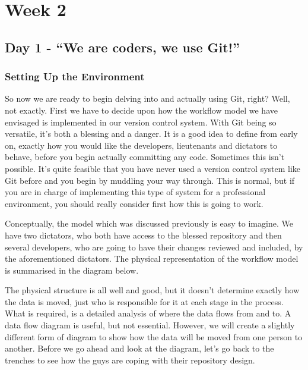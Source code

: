 \chapter{Week 2}
\section{Day 1 - ``We are coders, we use Git!''}
\subsection{Setting Up the Environment}
So now we are ready to begin delving into and actually using Git, right? Well, not exactly.
First we have to decide upon how the workflow model we have envisaged is implemented in our version control system.
With Git being so versatile, it's both a blessing and a danger.
It is a good idea to define from early on, exactly how you would like the developers, lieutenants and dictators to behave, before you begin actually committing any code.
Sometimes this isn't possible.
It's quite feasible that you have never used a version control system like Git before and you begin by muddling your way through.
This is normal, but if you are in charge of implementing this type of system for a professional environment, you should really consider first how this is going to work.

Conceptually, the model which was discussed previously is easy to imagine.
We have two dictators, who both have access to the blessed repository and then several developers, who are going to have their changes reviewed and included, by the aforementioned dictators.
The physical representation of the workflow model is summarised in the diagram below.


The physical structure is all well and good, but it doesn't determine exactly how the data is moved, just who is responsible for it at each stage in the process.
What is required, is a detailed analysis of where the data flows from and to.
A data flow diagram is useful, but not essential.
However, we will create a slightly different form of diagram to show how the data will be moved from one person to another.
Before we go ahead and look at the diagram, let's go back to the trenches to see how the guys are coping with their repository design.

